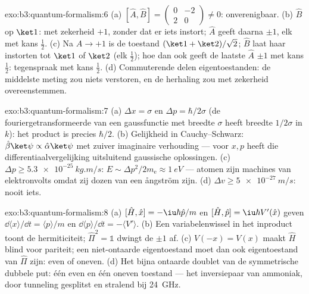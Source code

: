 \begin{solution}{exo:b3:quantum-formalism:6}
(a) $[\hat A, \hat B] = \begin{pmatrix}0 & -2\\ 2 & 0\end{pmatrix}
\neq 0$: onverenigbaar. (b) $\hat B$ op $\ket1$: met zekerheid $+1$,
zonder dat er iets instort; $\hat A$ geeft daarna $\pm1$, elk met kans
$\tfrac12$. (c) Na $\hat A \to +1$ is de toestand $(\ket1 + \ket2)/\sqrt2$; $\hat B$ laat haar instorten tot $\ket1$ of $\ket2$ (elk
$\tfrac12$); hoe dan ook geeft de laatste $\hat A$ $\pm1$ met kans
$\tfrac12$: tegenspraak met kans $\tfrac12$. (d) Commuterende
 delen eigentoestanden: de middelste meting zou niets
verstoren, en de herhaling zou met zekerheid overeenstemmen.
\end{solution}

\begin{solution}{exo:b3:quantum-formalism:7}
(a) $\Delta x = \sigma$ en $\Delta p = \hbar/2\sigma$ (de
fouriergetransformeerde van een gaussfunctie met breedte $\sigma$ heeft
breedte $1/2\sigma$ in $k$): het product is precies $\hbar/2$. (b)
Gelijkheid in Cauchy--Schwarz: $\hat\beta\ket\psi \propto \hat\alpha\ket\psi$ met zuiver imaginaire verhouding --- voor $x, p$
heeft die differentiaalvergelijking uitsluitend gaussische oplossingen.
(c) $\Delta p \ge \qty{5.3e-25}{kg.m/s}$: $E \sim
\Delta p^2/2m_{\text{e}} \approx \qty{1}{eV}$ --- atomen zijn machines van
elektronvolts omdat zij dozen van een ångström zijn. (d)
$\Delta v \ge \qty{5e-27}{m/s}$: nooit iets.
\end{solution}

\begin{solution}{exo:b3:quantum-formalism:8}
(a) $[\hat H, \hat x] = -\iu\hbar\hat p/m$ en $[\hat H, \hat p] =
\iu\hbar V'(\hat x)$ geven $\dd\langle x\rangle/\dd t = \langle
p\rangle/m$ en $\dd\langle p\rangle/\dd t = -\langle V'\rangle$. (b) Een
variabelenwissel in het inproduct toont de hermiticiteit;
$\hat\Pi^2 = \mathbb 1$ dwingt de  $\pm1$ af. (c) $V(-x) =
V(x)$ maakt $\hat H$ blind voor pariteit; een niet-ontaarde eigentoestand
moet dan ook eigentoestand van $\hat\Pi$ zijn: even of oneven. (d) Het
bijna ontaarde doublet van de symmetrische dubbele put: één even en één
oneven toestand --- het inversiepaar van ammoniak, door tunneling
gesplitst en stralend bij \qty{24}{GHz}.
\end{solution}

